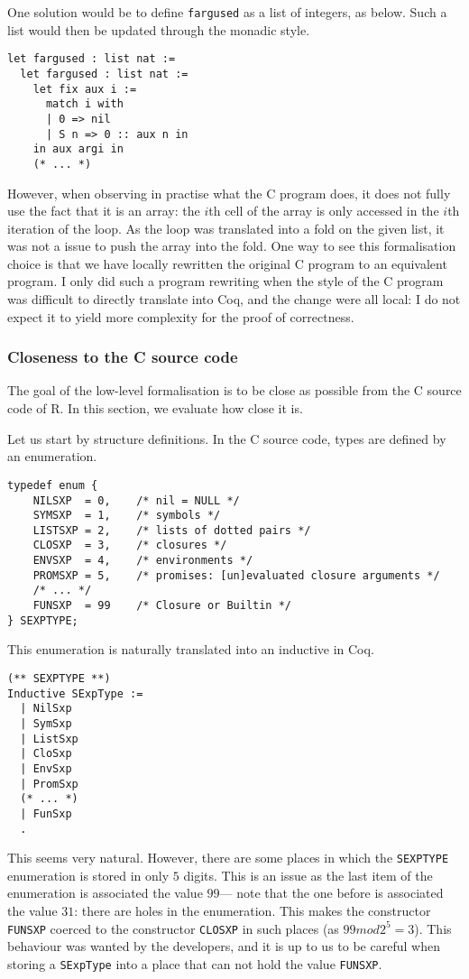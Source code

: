 \documentclass{article}
\newcommand\Coq{Coq}
\newcommand\R{R}
\newcommand\Cn{C}
\newcommand\mod{\mathit{mod}}
\begin{document}
One solution would be to define \texttt{fargused}
as a list of integers, as below.
Such a list would then be updated through the monadic style.
\begin{verbatim}
let fargused : list nat :=
  let fargused : list nat :=
    let fix aux i :=
      match i with
      | 0 => nil
      | S n => 0 :: aux n in
    in aux argi in
    (* ... *)
\end{verbatim}

However, when observing in practise what the \Cn{} program
does, it does not fully use the fact that it is an array:
the \(i\)th cell of the array is only accessed in the \(i\)th
iteration of the loop.
As the loop was translated into a fold on the given list,
it was not a issue to push the array into the fold.
One way to see this formalisation choice
is that we have locally rewritten the original \Cn{} program
to an equivalent program.
I only did such a program rewriting when the style of the \Cn{}
program was difficult to directly translate into \Coq{},
and the change were all local:
I do not expect it to yield more complexity for the proof of correctness.


\subsubsection{Closeness to the \Cn{} source code}
\label{sec:closeness}

The goal of the low-level formalisation is to be close as possible
from the \Cn{} source code of \R{}.
In this section, we evaluate how close it is.

Let us start by structure definitions.
In the \Cn{} source code, types are defined by an enumeration.
\begin{verbatim}
typedef enum {
    NILSXP  = 0,    /* nil = NULL */
    SYMSXP  = 1,    /* symbols */
    LISTSXP = 2,    /* lists of dotted pairs */
    CLOSXP  = 3,    /* closures */
    ENVSXP  = 4,    /* environments */
    PROMSXP = 5,    /* promises: [un]evaluated closure arguments */
    /* ... */
    FUNSXP  = 99    /* Closure or Builtin */
} SEXPTYPE;
\end{verbatim}
This enumeration is naturally translated into an inductive in \Coq{}.
\begin{verbatim}
(** SEXPTYPE **)
Inductive SExpType :=
  | NilSxp
  | SymSxp
  | ListSxp
  | CloSxp
  | EnvSxp
  | PromSxp
  (* ... *)
  | FunSxp
  .
\end{verbatim}
This seems very natural.
However, there are some places in which the \texttt{SEXPTYPE}
enumeration is stored in only \(5\) digits.
This is an issue as the last item of the enumeration
is associated the value \(99\)—%
note that the one before is associated the value \(31\):
there are holes in the enumeration.
This makes the constructor \texttt{FUNSXP} coerced
to the constructor \texttt{CLOSXP} in such places
(as \(99 \mod 2^5 = 3\)).
This behaviour was wanted by the developers,
and it is up to us to be careful when storing a \texttt{SExpType}
into a place that can not hold the value \texttt{FUNSXP}.
\end{document}
